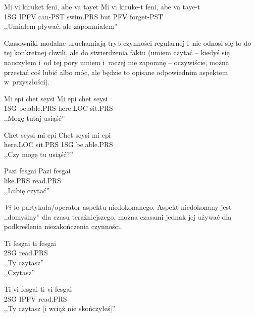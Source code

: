 \begin{spacing}{1.1}
\begin{exe}
	\ex
	\trans Mi vi kiruket feni, abe va tayet
	\gll  Mi vi kiruke-t feni, abe va taye-t\\
	  1SG IPFV can-PST swim.PRS but PFV forget-PST \\
	\glt  ,,Umiałem pływać, ale zapomniałem''
\end{exe}

Czasowniki modalne uruchamiają tryb czynności regularnej i~nie odnosi się to do
tej konkretnej chwili, ale do stwierdzenia faktu (umiem czytać -- kiedyś się
nauczyłem i~od tej pory umiem i~raczej nie zapomnę -- oczywiście, można przestać
coś lubić albo móc, ale będzie to opisane odpowiednim aspektem w~przyszłości).

\begin{exe}
	\ex
	\trans Mi epi chet seysi
	\gll  Mi epi chet seysi\\
	  1SG be.able.PRS here.LOC sit.PRS \\
	\glt  ,,Mogę tutaj usiąść''
\end{exe}

\begin{exe}
	\ex
	\trans Chet seysi mi epi
	\gll  Chet seysi mi epi\\
	  here.LOC sit.PRS 1SG be.able.PRS \\
	\glt  ,,Czy mogę tu usiąść?''
\end{exe}

\begin{exe}
	\ex
	\trans Pazi fesgai
	\gll  Pazi fesgai\\
	  like.PRS read.PRS \\
	\glt  ,,Lubię czytać''
\end{exe}

\emph{Vi} to partykuła/operator aspektu niedokonanego. Aspekt niedokonany jest
,,domyślny'' dla czasu teraźniejszego, można czasami jednak jej używać dla
podkreślenia niezakończenia czynności.

\begin{exe}
	\ex
	\trans Ti fesgai
	\gll  ti fesgai\\
	  2SG read.PRS \\
	\glt  ,,Ty czytasz'' \\ ,,Czytasz''
\end{exe}

\begin{exe}
	\ex
	\trans Ti vi fesgai
	\gll  ti vi fesgai\\
	  2SG IPFV read.PRS \\
	\glt  ,,Ty czytasz [i wciąż nie skończyłeś]''
\end{exe}


\end{spacing}
